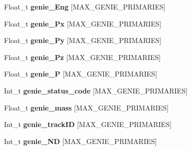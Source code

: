 \begin{DoxyCompactItemize}
\item 
\hypertarget{classanatree_af043b6371cd535eb566e58972a67220c}{Float\-\_\-t {\bfseries genie\-\_\-\-Eng} \mbox{[}M\-A\-X\-\_\-\-G\-E\-N\-I\-E\-\_\-\-P\-R\-I\-M\-A\-R\-I\-E\-S\mbox{]}}\label{classanatree_af043b6371cd535eb566e58972a67220c}

\item 
\hypertarget{classanatree_a4c2d04071d505e355abbf264e90b80ed}{Float\-\_\-t {\bfseries genie\-\_\-\-Px} \mbox{[}M\-A\-X\-\_\-\-G\-E\-N\-I\-E\-\_\-\-P\-R\-I\-M\-A\-R\-I\-E\-S\mbox{]}}\label{classanatree_a4c2d04071d505e355abbf264e90b80ed}

\item 
\hypertarget{classanatree_a7db2f195f7ff60b2e737772876b21bb4}{Float\-\_\-t {\bfseries genie\-\_\-\-Py} \mbox{[}M\-A\-X\-\_\-\-G\-E\-N\-I\-E\-\_\-\-P\-R\-I\-M\-A\-R\-I\-E\-S\mbox{]}}\label{classanatree_a7db2f195f7ff60b2e737772876b21bb4}

\item 
\hypertarget{classanatree_a837cf311f13dab7b64c8c0975d8a7527}{Float\-\_\-t {\bfseries genie\-\_\-\-Pz} \mbox{[}M\-A\-X\-\_\-\-G\-E\-N\-I\-E\-\_\-\-P\-R\-I\-M\-A\-R\-I\-E\-S\mbox{]}}\label{classanatree_a837cf311f13dab7b64c8c0975d8a7527}

\item 
\hypertarget{classanatree_afc98530654f7ad28cdfb88b0b1abe529}{Float\-\_\-t {\bfseries genie\-\_\-\-P} \mbox{[}M\-A\-X\-\_\-\-G\-E\-N\-I\-E\-\_\-\-P\-R\-I\-M\-A\-R\-I\-E\-S\mbox{]}}\label{classanatree_afc98530654f7ad28cdfb88b0b1abe529}

\item 
\hypertarget{classanatree_a54d585c52996ce1601987a431de66f30}{Int\-\_\-t {\bfseries genie\-\_\-status\-\_\-code} \mbox{[}M\-A\-X\-\_\-\-G\-E\-N\-I\-E\-\_\-\-P\-R\-I\-M\-A\-R\-I\-E\-S\mbox{]}}\label{classanatree_a54d585c52996ce1601987a431de66f30}

\item 
\hypertarget{classanatree_a56a75507b65422e29d6eb10a30e27063}{Float\-\_\-t {\bfseries genie\-\_\-mass} \mbox{[}M\-A\-X\-\_\-\-G\-E\-N\-I\-E\-\_\-\-P\-R\-I\-M\-A\-R\-I\-E\-S\mbox{]}}\label{classanatree_a56a75507b65422e29d6eb10a30e27063}

\item 
\hypertarget{classanatree_ae20891e57fed156ef6a66f1269cb56f6}{Int\-\_\-t {\bfseries genie\-\_\-track\-I\-D} \mbox{[}M\-A\-X\-\_\-\-G\-E\-N\-I\-E\-\_\-\-P\-R\-I\-M\-A\-R\-I\-E\-S\mbox{]}}\label{classanatree_ae20891e57fed156ef6a66f1269cb56f6}

\item 
\hypertarget{classanatree_aa04ad329f56a1064b75721c6ba02ec32}{Int\-\_\-t {\bfseries genie\-\_\-\-N\-D} \mbox{[}M\-A\-X\-\_\-\-G\-E\-N\-I\-E\-\_\-\-P\-R\-I\-M\-A\-R\-I\-E\-S\mbox{]}}\label{classanatree_aa04ad329f56a1064b75721c6ba02ec32}


\end{DoxyCompactItemize}

